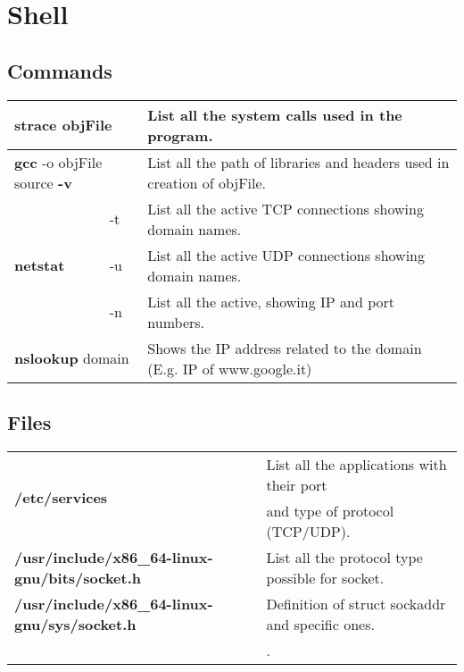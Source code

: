 \chapter{Shell}

\section{Commands}

\begin{table}[h]
\begin{tabular}{|l|l|l|}
\hline
\multicolumn{2}{|l|}{\textbf{strace} objFile} & {List all the system calls used in the program.}\\
\hline
\multicolumn{2}{|l|}{\textbf{gcc} -o objFile source \textbf{-v}} & {List all the path of libraries and headers used in creation of objFile.}\\
\hline
\multirow{3}{*}{\textbf{netstat}} & {-t} & {List all the active TCP connections showing domain names.}\\
\cline{2-3}
& {-u} & {List all the active UDP connections showing domain names.}\\
\cline{2-3}
& {-n} & {List all the active, showing IP and port numbers.}\\
\hline
\multicolumn{2}{|l|}{\textbf{nslookup} domain} & {Shows the IP address related to the domain (E.g. IP of www.google.it)}\\
\hline
\end{tabular}
\end{table}

\section{Files}

\begin{table}[h]
\begin{tabular}{|l|l|}
\hline
\multirow{2}{*}{\textbf{/etc/services}} & {List all the applications with their port}\\
& {and type of protocol (TCP/UDP).}\\
\hline
{\textbf{/usr/include/x86\_64-linux-gnu/bits/socket.h}} & {List all the protocol type possible for socket.}\\
\hline
{\textbf{/usr/include/x86\_64-linux-gnu/sys/socket.h}} & {Definition of struct sockaddr and specific ones.}\\
\hline
{\textbf{}} & {.}\\
\hline
\end{tabular}
\end{table}

